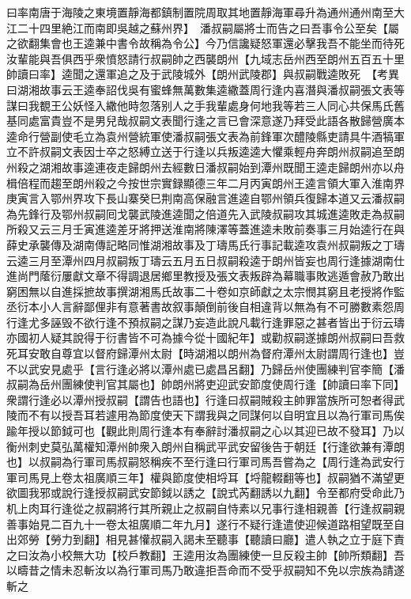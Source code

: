 曰率南唐于海陵之東境置靜海都鎮制置院周取其地置靜海軍尋升為通州通州南至大江二十四里絶江而南即吳越之蘇州界】　潘叔嗣屬將士而告之曰吾事令公至矣【屬之欲翻集會也王逵兼中書令故稱為令公】今乃信讒疑怒軍還必擊我吾不能坐而待死汝輩能與吾俱西乎衆憤怒請行叔嗣帥之西襲朗州【九域志岳州西至朗州五百五十里帥讀曰率】逵聞之還軍追之及于武陵城外【朗州武陵郡】與叔嗣戰逵敗死　【考異曰湖湘故事云王逵奉詔伐吳有蜜蜂無萬數集逵繖蓋周行逢内喜潛與潘叔嗣張文表等謀曰我覩王公妖怪入繖他時忽落别人之手我輩處身何地我等若三人同心共保馬氏舊基同處富貴豈不是男兒哉叔嗣文表聞行逢之言已會深意遂乃拜受此語各散歸營廣本逵命行營副使毛立為袁州營統軍使潘叔嗣張文表為前鋒軍次醴陵縣吏請具牛酒犒軍立不許叔嗣文表因士卒之怒縛立送于行逢以兵叛逵逵大懼乘輕舟奔朗州叔嗣追至朗州殺之湖湘故事逵連夜走歸朗州去經數日潘叔嗣始到潭州既聞王逵走歸朗州亦以舟楫倍程而趨至朗州殺之今按世宗實録顯德三年二月丙寅朗州王逵言領大軍入淮南界庚寅言入鄂州界攻下長山寨癸巳荆南高保融言進逵自鄂州領兵復歸本道又云潘叔嗣為先鋒行及鄂州叔嗣囘戈襲武陵進逵聞之倍道先入武陵叔嗣攻其城進逵敗走為叔嗣所殺又云三月壬寅進逵差牙將押送淮南將陳澤等蓋進逵未敗前奏事三月始逵行在與薛史承襲傳及湖南傳記略同惟湖湘故事及丁璹馬氏行事記載逵攻袁州叔嗣叛之丁璹云逵三月至潭州四月叔嗣叛丁璹云五月五日叔嗣殺逵于朗州皆妄也周行逢據湖南仕進尚門䕃衍屢獻文章不得調退居鄉里教授及張文表叛辟為幕職事敗逃遁會赦乃敢出窮困無以自進採摭故事撰湖湘馬氏故事二十卷如京師獻之太宗憫其窮且老授將作監丞衍本小人言辭鄙俚非有意著書故叙事顛倒前後自相違背以無為有不可勝數素怨周行逢尤多誣毁不欲行逢不預叔嗣之謀乃妄造此說凡載行逢罪惡之甚者皆出于衍云璹亦國初人疑其說得于衍書皆不可為據今從十國紀年】或勸叔嗣遂據朗州叔嗣曰吾救死耳安敢自尊宜以督府歸潭州太尉【時湖湘以朗州為督府潭州太尉謂周行逢也】豈不以武安見處乎【言行逢必將以潭州處已處昌呂翻】乃歸岳州使團練判官李簡【潘叔嗣為岳州團練使判官其屬也】帥朗州將吏迎武安節度使周行逢【帥讀曰率下同】衆謂行逢必以潭州授叔嗣【謂告也語也】行逢曰叔嗣賊殺主帥罪當族所可恕者得武陵而不有以授吾耳若遽用為節度使天下謂我與之同謀何以自明宜且以為行軍司馬俟踰年授以節鉞可也【觀此則周行逢本有奉辭討潘叔嗣之心以其迎已故不發耳】乃以衡州刺史莫弘萬權知潭州帥衆入朗州自稱武平武安留後告于朝廷【行逢欲兼有潭朗也】以叔嗣為行軍司馬叔嗣怒稱疾不至行逢曰行軍司馬吾嘗為之【周行逢為武安行軍司馬見上卷太祖廣順三年】權與節度使相埒耳【埒龍輟翻等也】叔嗣猶不滿望更欲圖我邪或說行逢授叔嗣武安節鉞以誘之【說式芮翻誘以九翻】令至都府受命此乃机上肉耳行逢從之叔嗣將行其所親止之叔嗣自恃素以兄事行逢相親善【行逢叔嗣親善事始見二百九十一卷太祖廣順二年九月】遂行不疑行逢遣使迎候道路相望既至自出郊勞【勞力到翻】相見甚懽叔嗣入謁未至聽事【聽讀曰廳】遣人執之立于庭下責之曰汝為小校無大功【校戶教翻】王逵用汝為團練使一旦反殺主帥【帥所類翻】吾以疇昔之情未忍斬汝以為行軍司馬乃敢違拒吾命而不受乎叔嗣知不免以宗族為請遂斬之

